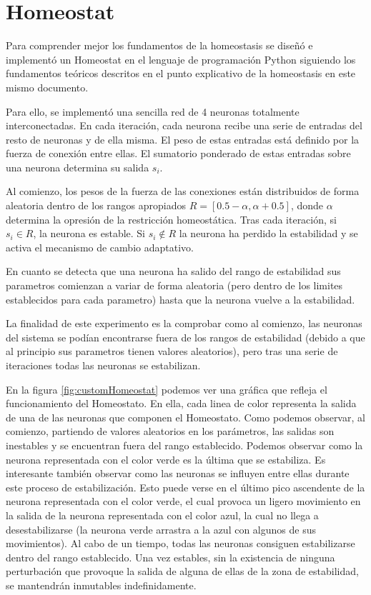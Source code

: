 \chapter{Homeostat}\label{ch:anexo1}
Para comprender mejor los fundamentos de la homeostasis se diseñó e implementó un Homeostat en el lenguaje de programación Python siguiendo los fundamentos teóricos descritos en el punto explicativo de la homeostasis en este
mismo documento.

Para ello, se implementó una sencilla red de 4 neuronas totalmente interconectadas. En cada iteración, cada neurona recibe una serie de entradas del resto de neuronas y de ella misma. El peso de estas entradas está definido
por la fuerza de conexión entre ellas. El sumatorio ponderado de estas entradas sobre una neurona determina su salida $s_{i}$.

Al comienzo, los pesos de la fuerza de las conexiones están distribuidos de forma aleatoria dentro de los rangos apropiados $R = [0.5 - \alpha, \alpha + 0.5]$, donde $\alpha$ determina la opresión de la restricción homeostática.
Tras cada iteración, si $s_{i} \in R$, la neurona es estable. Si $s_{i} \notin R$ la neurona ha perdido la estabilidad y se activa el mecanismo de cambio adaptativo.

En cuanto se detecta que una neurona ha salido del rango de estabilidad sus parametros comienzan a variar de forma aleatoria (pero dentro de los limites establecidos para cada parametro) hasta que la neurona vuelve a la estabilidad.

La finalidad de este experimento es la comprobar como al comienzo, las neuronas del sistema se podían encontrarse fuera de los rangos de estabilidad (debido a que al principio sus parametros tienen valores aleatorios), pero tras una
serie de iteraciones todas las neuronas se estabilizan.

En la figura \ref{fig:customHomeostat} podemos ver una gráfica que refleja el funcionamiento del Homeostato. En ella, cada linea de color representa la salida de una de las neuronas que componen el Homeostato. Como podemos observar,
al comienzo, partiendo de valores aleatorios en los parámetros, las salidas son inestables y se encuentran fuera del rango establecido. Podemos observar como la neurona representada con el color verde es la última que se estabiliza. Es interesante
también observar como las neuronas se influyen entre ellas durante este proceso de estabilización. Esto puede verse en el último pico ascendente de la neurona representada con el color verde, el cual provoca un ligero movimiento en la
salida de la neurona representada con el color azul, la cual no llega a desestabilizarse (la neurona verde arrastra a la azul con algunos de sus movimientos). Al cabo de un tiempo, todas las neuronas consiguen estabilizarse dentro
del rango establecido. Una vez estables, sin la existencia de ninguna perturbación que provoque la salida de alguna de ellas de la zona de estabilidad, se mantendrán inmutables indefinidamente.

